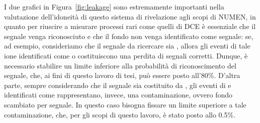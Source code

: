 I due grafici in Figura~\ref{fig:leakage} sono estremamente importanti nella valutazione dell'idoneità di questo sistema di rivelazione agli scopi di NUMEN, in quanto per riuscire a misurare processi rari come quelli di DCE è essenziale che il segnale venga riconosciuto e che il fondo non venga identificato come segnale: se, ad esempio, consideriamo che il segnale da ricercare sia , allora gli eventi di tale ione identificati come  o  costituiscono una perdita di segnali corretti. 
Dunque, è necessario stabilire un limite inferiore alla probabilità di riconoscimento del segnale, che, ai fini di questo lavoro di tesi, può essere posto all'80\%.
D'altra parte, sempre considerando che il segnale sia costituito da , gli eventi di  e  identificati come  rappresentano, invece, una contaminazione, ovvero fondo scambiato per segnale.
In questo caso bisogna fissare un limite superiore a tale contaminazione, che, per gli scopi di questo lavoro, è stato posto allo 0.5\%.





